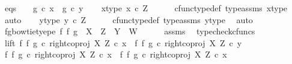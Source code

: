\begin{isabellebody}
\ eqs{\isacharcolon}{\kern0pt}\ \ \ \ {\isachardoublequoteopen}g\ {\isasymcirc}\isactrlsub c\ x\ {\isacharequal}{\kern0pt}\ g\ {\isasymcirc}\isactrlsub c\ y{\isachardoublequoteclose}\isanewline
\isanewline
\ \ \isamarkupfalse%
\ x{\isacharunderscore}{\kern0pt}type{}{\isacharcolon}{\kern0pt}\ {\isachardoublequoteopen}x\ {\isasymin}\isactrlsub c\ Z{\isachardoublequoteclose}\isanewline
\ \ \ \ \isamarkupfalse%
\ cfunc{\isacharunderscore}{\kern0pt}type{\isacharunderscore}{\kern0pt}def\ type{\isacharunderscore}{\kern0pt}assms{\isacharparenleft}{\kern0pt}{}{\isacharparenright}{\kern0pt}\ x{\isacharunderscore}{\kern0pt}type\ \isamarkupfalse%
\ auto\isanewline
\ \ \isamarkupfalse%
\ y{\isacharunderscore}{\kern0pt}type{}{\isacharcolon}{\kern0pt}\ {\isachardoublequoteopen}y\ {\isasymin}\isactrlsub c\ Z{\isachardoublequoteclose}\isanewline
\ \ \ \ \isamarkupfalse%
\ cfunc{\isacharunderscore}{\kern0pt}type{\isacharunderscore}{\kern0pt}def\ type{\isacharunderscore}{\kern0pt}assms{\isacharparenleft}{\kern0pt}{}{\isacharparenright}{\kern0pt}\ y{\isacharunderscore}{\kern0pt}type\ \isamarkupfalse%
\ auto\isanewline
\ \ \isamarkupfalse%
\ fg{\isacharunderscore}{\kern0pt}bowtie{\isacharunderscore}{\kern0pt}tyepe{\isacharcolon}{\kern0pt}\ {\isachardoublequoteopen}f\ {\isasymbowtie}\isactrlsub f\ g\ {\isacharcolon}{\kern0pt}\ X\ {\isasymCoprod}\ Z\ {\isasymrightarrow}\ Y\ {\isasymCoprod}\ W{\isachardoublequoteclose}\isanewline
\ \ \ \ \isamarkupfalse%
\ assms\ \isamarkupfalse%
\ typecheck{\isacharunderscore}{\kern0pt}cfuncs\isanewline
\ \ \isamarkupfalse%
\ lift{\isacharcolon}{\kern0pt}\ {\isachardoublequoteopen}{\isacharparenleft}{\kern0pt}f\ {\isasymbowtie}\isactrlsub f\ g{\isacharparenright}{\kern0pt}\ {\isasymcirc}\isactrlsub c\ right{\isacharunderscore}{\kern0pt}coproj\ X\ Z\ {\isasymcirc}\isactrlsub c\ x\ {\isacharequal}{\kern0pt}\ {\isacharparenleft}{\kern0pt}f\ {\isasymbowtie}\isactrlsub f\ g{\isacharparenright}{\kern0pt}\ {\isasymcirc}\isactrlsub c\ right{\isacharunderscore}{\kern0pt}coproj\ X\ Z\ {\isasymcirc}\isactrlsub c\ y{\isachardoublequoteclose}\isanewline
\ \ \isamarkupfalse%
\ {\isacharminus}{\kern0pt}\ \isanewline
\ \ \ \ \isamarkupfalse%
\ {\isachardoublequoteopen}{\isacharparenleft}{\kern0pt}f\ {\isasymbowtie}\isactrlsub f\ g{\isacharparenright}{\kern0pt}\ {\isasymcirc}\isactrlsub c\ right{\isacharunderscore}{\kern0pt}coproj\ X\ Z\ {\isasymcirc}\isactrlsub c\ x\ {\isacharequal}{\kern0pt}\ {\isacharparenleft}{\kern0pt}{\isacharparenleft}{\kern0pt}f\ {\isasymbowtie}\isactrlsub f\ g{\isacharparenright}{\kern0pt}\ {\isasymcirc}\isactrlsub c\ right{\isacharunderscore}{\kern0pt}coproj\ X\ Z{\isacharparenright}{\kern0pt}\ {\isasymcirc}\isactrlsub c\ x{\isachardoublequoteclose}\isanewline

\end{isabellebody}
